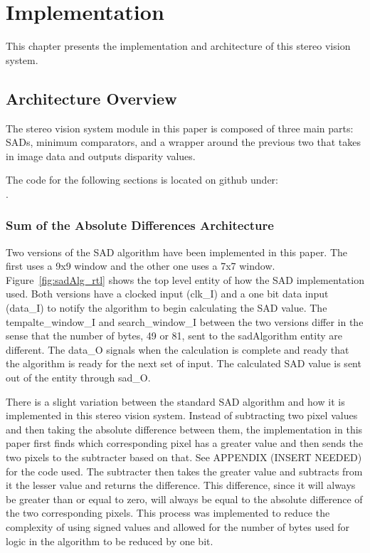 \chapter{Implementation}
\label{impl}

This chapter presents the implementation and architecture of this stereo vision system.

\section{Architecture Overview}

The stereo vision system module in this paper is composed of three main parts: SADs, minimum comparators, and a wrapper around the previous two that takes in image data and outputs disparity values.

The code for the following sections is located on github under:
\\.

\subsection{Sum of the Absolute Differences Architecture}

Two versions of the SAD algorithm have been implemented in this paper. The first uses a 9x9 window and the other one uses a 7x7 window. Figure~\ref{fig:sadAlg_rtl} shows the top level entity of how the SAD implementation used. Both versions have a clocked input (clk\_I) and a one bit data input (data\_I) to notify the algorithm to begin calculating the SAD value. The tempalte\_window\_I and search\_window\_I between the two versions differ in the sense that the number of bytes, 49 or 81, sent to the sadAlgorithm entity are different. The data\_O signals when the calculation is complete and ready that the algorithm is ready for the next set of input. The calculated SAD value is sent out of the entity through sad\_O.

There is a slight variation between the standard SAD algorithm and how it is implemented in this stereo vision system. Instead of subtracting two pixel values and then taking the absolute difference between them, the implementation in this paper first finds which corresponding pixel has a greater value and then sends the two pixels to the subtracter based on that. See APPENDIX (INSERT NEEDED) for the code used. The subtracter then takes the greater value and subtracts from it the lesser value and returns the difference. This difference, since it will always be greater than or equal to zero, will always be equal to the absolute difference of the two corresponding pixels. This process was implemented to reduce the complexity of using signed values and allowed for the number of bytes used for logic in the algorithm to be reduced by one bit.

